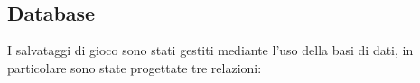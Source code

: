 \documentclass[italian,12pt,a4paper]{article}
\begin{document}
	
	\begin{figure}
		\centering
		\\
		\\
		\label{fig:immagini}
	\end{figure}
	
	\subsection{Database}
	
	I salvataggi di gioco sono stati gestiti mediante l'uso della basi di dati, in particolare sono state progettate tre relazioni:
	
\end{document}
